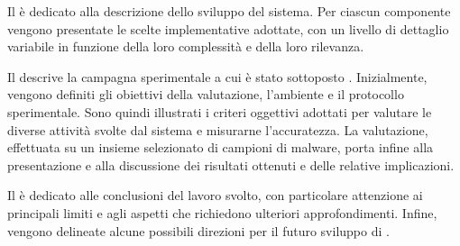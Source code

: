 Il  è dedicato alla descrizione dello sviluppo del sistema. Per ciascun componente vengono presentate le scelte implementative adottate, con un livello di dettaglio variabile in funzione della loro complessità e della loro rilevanza. 

Il  descrive la campagna sperimentale a cui è stato sottoposto \system{}. Inizialmente, vengono definiti gli obiettivi della valutazione, l'ambiente e il protocollo sperimentale. Sono quindi illustrati i criteri oggettivi adottati per valutare le diverse attività svolte dal sistema e misurarne l'accuratezza. La valutazione, effettuata su un insieme selezionato di campioni di malware, porta infine alla presentazione e alla discussione dei risultati ottenuti e delle relative implicazioni.

Il  è dedicato alle conclusioni del lavoro svolto, con particolare attenzione ai principali limiti e agli aspetti che richiedono ulteriori approfondimenti. Infine, vengono delineate alcune possibili direzioni per il futuro sviluppo di \system{}.